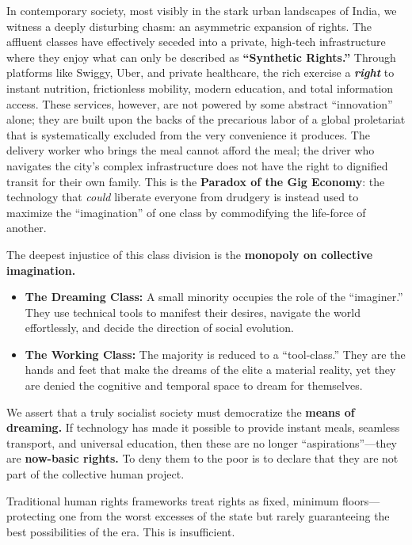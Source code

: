 In contemporary society, most visibly in the stark urban landscapes of
India, we witness a deeply disturbing chasm: an asymmetric expansion of
rights. The affluent classes have effectively seceded into a private,
high-tech infrastructure where they enjoy what can only be described as
\textbf{``Synthetic Rights.''} Through platforms like Swiggy, Uber, and
private healthcare, the rich exercise a \textbf{\emph{right}} to instant
nutrition, frictionless mobility, modern education, and total
information access. These services, however, are not powered by some
abstract ``innovation'' alone; they are built upon the backs of the
precarious labor of a global proletariat that is systematically excluded
from the very convenience it produces. The delivery worker who brings
the meal cannot afford the meal; the driver who navigates the city's
complex infrastructure does not have the right to dignified transit for
their own family. This is the \textbf{Paradox of the Gig Economy}: the
technology that \emph{could} liberate everyone from drudgery is instead
used to maximize the ``imagination'' of one class by commodifying the
life-force of another.

The deepest injustice of this class division is the \textbf{monopoly on
collective imagination.}

\begin{itemize}
\item
  \textbf{The Dreaming Class:} A small minority occupies the role of the
  ``imaginer.'' They use technical tools to manifest their desires,
  navigate the world effortlessly, and decide the direction of social
  evolution.
\item
  \textbf{The Working Class:} The majority is reduced to a
  ``tool-class.'' They are the hands and feet that make the dreams of
  the elite a material reality, yet they are denied the cognitive and
  temporal space to dream for themselves.
\end{itemize}

We assert that a truly socialist society must democratize the
\textbf{means of dreaming.} If technology has made it possible to
provide instant meals, seamless transport, and universal education, then
these are no longer ``aspirations''---they are \textbf{now-basic
rights.} To deny them to the poor is to declare that they are not part
of the collective human project.

Traditional human rights frameworks treat rights as fixed, minimum
floors---protecting one from the worst excesses of the state but rarely
guaranteeing the best possibilities of the era. This is insufficient.

